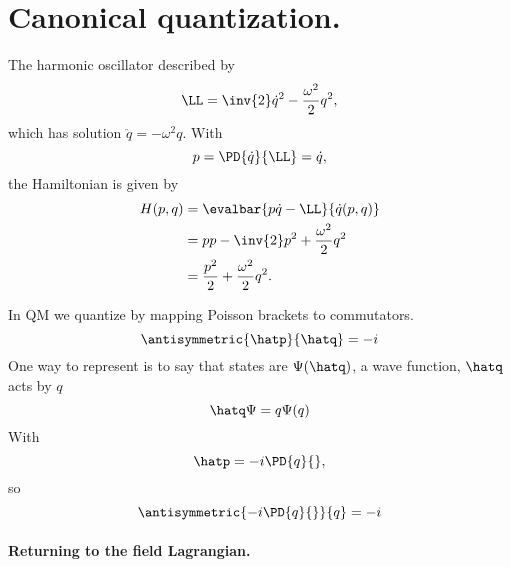%
%
\section{Canonical quantization.}

The harmonic oscillator described by
\begin{equation}\label{eqn:qftLecture4:740}
\LL = \inv{2} \dot{q}^2 - \frac{\omega^2}{2} q^2,
\end{equation}
which has solution \(\ddot{q} = - \omega^2 q\).
With
\begin{equation}\label{eqn:qftLecture4:760}
p = \PD{\dot{q}}{\LL} = \dot{q},
\end{equation}
the Hamiltonian is given by
\begin{equation}\label{eqn:qftLecture4:780}
\begin{aligned}
H(p,q) 
&= \evalbar{p \dot{q} - \LL}{\dot{q}(p, q)} \\
&= p p - \inv{2} p^2 + \frac{\omega^2}{2} q^2 \\
&= \frac{p^2}{2} + \frac{\omega^2}{2} q^2.
\end{aligned}
\end{equation}

In QM we quantize by mapping Poisson brackets to commutators.
\begin{equation}\label{eqn:qftLecture4:800}
\antisymmetric{\hatp}{\hatq} = -i
\end{equation}
One way to represent is to say that states are \( \Psi(\hatq) \), a wave function, \( \hatq \) acts by \( q \)
\begin{equation}\label{eqn:qftLecture4:820}
\hatq \Psi = q \Psi(q)
\end{equation}
With
\begin{equation}\label{eqn:qftLecture4:840}
\hatp = -i \PD{q}{},
\end{equation}
so
\begin{equation}\label{eqn:qftLecture4:860}
\antisymmetric{ -i \PD{q}{} } { q} = -i
\end{equation}

\paragraph{Returning to the field Lagrangian.}

